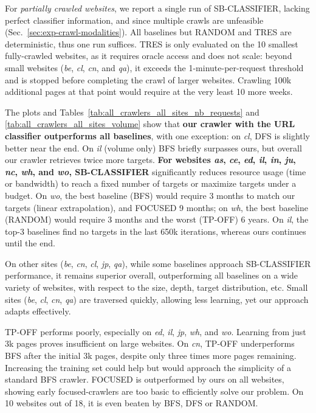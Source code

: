 For \emph{partially crawled websites}, we report a single run of \textsf{\small SB-CLASSIFIER}, lacking perfect classifier information, and since multiple crawls are unfeasible 
(Sec.~\ref{sec:exp-crawl-modalities}). All baselines but \textsf{\small RANDOM} and \textsf{\small TRES} are deterministic, thus one run suffices. \textsf{\small TRES} is only evaluated on the 10 smallest fully-crawled websites, as it requires oracle access and does not scale: beyond small websites (\emph{be}, \emph{cl}, \emph{cn}, and \emph{qa}), it exceeds the 1-minute-per-request threshold and is stopped before completing the crawl of larger websites. Crawling 100k additional pages at that point would require at the very least 10 more weeks.

The plots and Tables~\ref{tab:all_crawlers_all_sites_nb_requests} and \ref{tab:all_crawlers_all_sites_volume} show that \textbf{our crawler with the URL
classifier outperforms all baselines}, with one exception: on \emph{cl}, \textsf{\small DFS} is slightly better near the end. On \emph{il} (volume only) \textsf{\small BFS} briefly surpasses ours, but overall our crawler retrieves twice more targets.  
\textbf{For websites \emph{as}, \emph{ce}, \emph{ed}, \emph{il}, \emph{in}, \emph{ju}, \emph{nc}, \emph{wh}, and \emph{wo}, \textsf{\small SB-CLASSIFIER}} significantly reduces resource usage (time or bandwidth) to reach a fixed number of targets or maximize targets under a budget. 
On \emph{wo}, the best baseline (\textsf{\small BFS}) would require 3 months to match our targets (linear extrapolation), and \textsf{\small FOCUSED} 9 months; on \emph{wh}, the best baseline (\textsf{\small RANDOM}) would require 3 months and the worst (\textsf{\small TP-OFF}) 6 years. On \emph{il}, the top-3 baselines find no targets in the last 650k iterations, whereas ours continues until the end.


On other sites (\emph{be}, \emph{cn}, \emph{cl}, \emph{jp}, \emph{qa}), while some baselines approach \textsf{\small SB-CLASSIFIER} performance, it remains superior overall, outperforming all baselines on a wide variety of websites, with respect to the size, depth, target distribution, etc.
Small sites (\emph{be}, \emph{cl}, \emph{cn}, \emph{qa}) are traversed quickly, allowing less learning, yet our approach adapts effectively.  

\textsf{\small TP-OFF} performs poorly, especially on \emph{ed}, \emph{il}, \emph{jp}, \emph{wh}, and \emph{wo}.
Learning from just 3k pages proves insufficient on large websites. 
On \emph{cn}, \textsf{\small TP-OFF} underperforms BFS after the initial 3k pages, despite only three times more pages remaining. Increasing the training set could help but would approach the simplicity of a standard \textsf{\small BFS} crawler.
\textsf{\small FOCUSED} is outperformed by ours on all websites, showing early focused-crawlers are too basic to efficiently solve our problem.
On 10 websites out of 18, it is even beaten by \textsf{\small BFS}, \textsf{\small DFS} or \textsf{\small RANDOM}.


